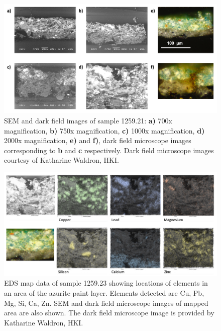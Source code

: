 \begin{figure}[H]
  \centering
  \includegraphics[width=\linewidth]{1259-23_imgs}
\caption[SEM and dark field images of sample 1259.21.]{SEM and dark field images of sample 1259.21: \textbf{a)} 700x magnification, \textbf{b)} 750x magnification, \textbf{c)} 1000x magnification, \textbf{d)} 2000x magnification, \textbf{e)} and \textbf{f)}, dark field microscope images corresponding to \textbf{b} and \textbf{c} respectively. Dark field microscope images courtesy of Katharine Waldron, HKI.}
\label{fig:1259.23_imgs}
\end{figure}

\begin{figure}[H]
  \centering
  \includegraphics[width=0.9\linewidth]{1259-23_mapdata}
\caption[EDS map data, sample 1259.23.]{EDS map data of sample 1259.23 showing locations of elements in an area of the azurite paint layer. Elements detected are Cu, Pb, Mg, Si, Ca, Zn. SEM and dark field microscope images of mapped area are also shown. The dark field microscope image is provided by Katharine Waldron, HKI.}
\label{fig:1259.23_mapdata}
\end{figure}


